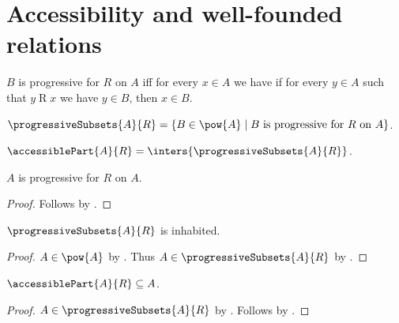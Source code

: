 



\section{Accessibility and well-founded relations}

\begin{definition}\label{progressive_on}
    $B$ is progressive for $R$ on $A$ iff for every $x\in A$ we have
        if for every $y\in A$ such that $y\mathrel{R}x$ we have $y\in B$,
        then $x\in B$.
\end{definition}

\begin{definition}\label{progressive_subsets}
    $\progressiveSubsets{A}{R} =
        \{B\in\pow{A}\mid
            \text{$B$ is progressive for $R$ on $A$}\}$.
\end{definition}

\begin{definition}\label{accessible_part}
    $\accessiblePart{A}{R}=\inters{\progressiveSubsets{A}{R}}$.
\end{definition}

\begin{lemma}\label{carrier_is_progressive}
    $A$ is progressive for $R$ on $A$.
\end{lemma}
\begin{proof}
    Follows by .
\end{proof}

\begin{lemma}\label{progressive_subsets_inhabited}
    $\progressiveSubsets{A}{R}$ is inhabited.
\end{lemma}
\begin{proof}
    $A\in\pow{A}$ by .
    Thus $A\in\progressiveSubsets{A}{R}$
        by .
\end{proof}

\begin{proposition}\label{accessible_part_subseteq}
    $\accessiblePart{A}{R}\subseteq A$.
\end{proposition}
\begin{proof}
    $A\in\progressiveSubsets{A}{R}$
        by .
    Follows by .
\end{proof}

